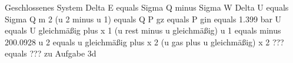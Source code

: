 Geschlossenes System
Delta E equals Sigma Q minus Sigma W
Delta U equals Sigma Q
m 2 (u 2 minus u 1) equals Q
P gz equals P gin equals 1.399 bar
U equals U gleichmäßig plus x 1 (u rest minus u gleichmäßig)
u 1 equals minus 200.0928
u 2 equals u gleichmäßig plus x 2 (u gas plus u gleichmäßig)
x 2 ??? equals ??? 
zu Aufgabe 3d